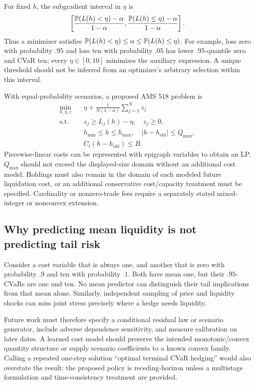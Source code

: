 For fixed $h$, the subgradient interval in $\eta$ is
\[
 \left[\frac{\mathbb P(L(h)<\eta)-\alpha}{1-\alpha},
       \frac{\mathbb P(L(h)\leq\eta)-\alpha}{1-\alpha}\right].
\]
Thus a minimizer satisfies $\mathbb P(L(h)<\eta)\leq\alpha\leq\mathbb P(L(h)\leq\eta)$. For example, loss zero with probability $.95$ and loss ten with probability $.05$ has lower $.95$-quantile zero and CVaR ten; every $\eta\in[0,10]$ minimizes the auxiliary expression. A unique threshold should not be inferred from an optimizer's arbitrary selection within this interval.

With equal-probability scenarios, a proposed AMS 518 problem is
\begin{align}
 \min_{h,\eta,z}\quad&\eta+\frac{1}{N(1-\alpha)}\sum_{j=1}^N z_j\label{eq:lp}\\
 \text{s.t.}\quad& z_j\geq L_j(h)-\eta,\quad z_j\geq0,\nonumber\\
 &h_{\min}\leq h\leq h_{\max},\quad |h-h_{\mathrm{old}}|\leq Q_{\max},\nonumber\\
 &C_t(h-h_{\mathrm{old}})\leq B.\nonumber
\end{align}
Piecewise-linear costs can be represented with epigraph variables to obtain an LP. $Q_{\max}$ should not exceed the displayed-size domain without an additional cost model. Holdings must also remain in the domain of each modeled future liquidation cost, or an additional conservative cost/capacity treatment must be specified. Cardinality or nonzero-trade fees require a separately stated mixed-integer or nonconvex extension.

\subsection{Why predicting mean liquidity is not predicting tail risk}
Consider a cost variable that is always one, and another that is zero with probability $.9$ and ten with probability $.1$. Both have mean one, but their $.95$-CVaRs are one and ten. No mean predictor can distinguish their tail implications from that mean alone. Similarly, independent sampling of price and liquidity shocks can miss joint stress precisely where a hedge needs liquidity.

Future work must therefore specify a conditional residual law or scenario generator, include adverse dependence sensitivity, and measure calibration on later dates. A learned cost model should preserve the intended monotonic/convex quantity structure or supply scenario coefficients to a known convex family. Calling a repeated one-step solution ``optimal terminal CVaR hedging'' would also overstate the result: the proposed policy is receding-horizon unless a multistage formulation and time-consistency treatment are provided.

